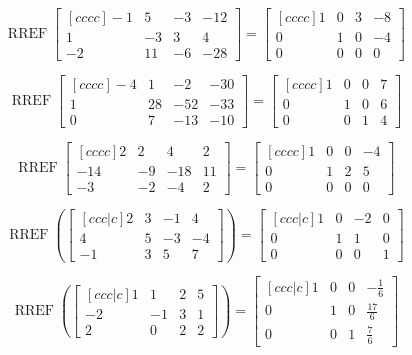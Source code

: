 \documentclass{article}
\DeclareMathOperator{\RREF}{RREF}
\begin{document}
\[ \RREF \begin{bmatrix}[cccc]
-1 & 5 & -3 & -12 \\
1 & -3 & 3 & 4 \\
-2 & 11 & -6 & -28
\end{bmatrix} =
\begin{bmatrix}[cccc]
1 & 0 & 3 & -8 \\
0 & 1 & 0 & -4 \\
0 & 0 & 0 & 0
\end{bmatrix}
\]

\[ \RREF \begin{bmatrix}[cccc]
-4 & 1 & -2 & -30 \\
1 & 28 & -52 & -33 \\
0 & 7 & -13 & -10
\end{bmatrix} =
\begin{bmatrix}[cccc]
1 & 0 & 0 & 7 \\
0 & 1 & 0 & 6 \\
0 & 0 & 1 & 4
\end{bmatrix}
\]

\[ \RREF \begin{bmatrix}[cccc]
2 & 2 & 4 & 2 \\
-14 & -9 & -18 & 11 \\
-3 & -2 & -4 & 2
\end{bmatrix} =
\begin{bmatrix}[cccc]
1 & 0 & 0 & -4 \\
0 & 1 & 2 & 5 \\
0 & 0 & 0 & 0
\end{bmatrix}
\]


 \[\RREF\left( \begin{bmatrix}[ccc|c] 2 & 3 & -1 & 4 \\ 4 & 5 &-3 & -4 \\ -1 & 3 & 5 & 7 \end{bmatrix} \right) = \begin{bmatrix}[ccc|c] 1 &0 & -2 & 0 \\ 0 &1 &1 & 0 \\ 0 & 0& 0& 1 \end{bmatrix} \] 


\[\RREF\left( \begin{bmatrix}[ccc|c]
1 & 1& 2&5 \\ -2 &-1 &3 & 1\\ 2 & 0 &2 & 2
\end{bmatrix} \right) 
= \begin{bmatrix}[ccc|c]
1 & 0 &0 &-\frac{1}{6} \\ 0& 1& 0 & \frac{17}{6} \\ 0 &0 & 1& \frac{7}{6} 
\end{bmatrix}\]
\end{document}
